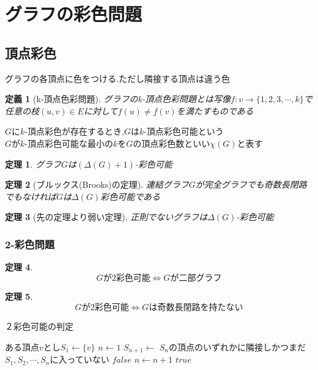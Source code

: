 \documentclass[a4j,10.5pt]{jarticle}
\theoremstyle{break}
\newtheorem{defi}{定義}[section]
\newtheorem{theo}{定理}[section]
\begin{document}
\newpage

\section{グラフの彩色問題}
\subsection{頂点彩色}
グラフの各頂点に色をつける.ただし隣接する頂点は違う色
\begin{defi}[k-頂点色彩問題]
グラフのk-頂点色彩問題とは写像$f:v \rightarrow \{1,2,3,\cdots,k\}$で任意の枝$(u,v) \in E$に対して$f(u) \neq f(v)$を満たすものである
\end{defi}
$G$に$k$-頂点彩色が存在するとき,$G$は$k$-頂点彩色可能という\\
$G$が$k$-頂点彩色可能な最小の$k$を$G$の頂点彩色数といい$\chi(G)$と表す

\begin{theo}
グラフ$G$は$(\Delta(G)+1)$-彩色可能
\end{theo}

\begin{theo}[ブルックス(Brooks)の定理]
連結グラフ$G$が完全グラフでも奇数長閉路でもなければ$G$は$\Delta(G)$彩色可能である
\end{theo}

\begin{theo}[先の定理より弱い定理]
正則でないグラフは$\Delta(G)$-彩色可能
\end{theo}

\subsubsection{2-彩色問題}
\begin{theo}
\[Gが2彩色可能 \Leftrightarrow Gが二部グラフ\]
\end{theo}

\begin{theo}
\[Gが2彩色可能 \Leftrightarrow Gは奇数長閉路を持たない\]
\end{theo}

\begin{algorithm}
\caption{２彩色可能の判定}
\begin{algorithmic}[1]
\STATE ある頂点$v$とし$S_1 \leftarrow \{v\}$
\STATE $n \leftarrow 1$
\STATE $S_{n + 1} \leftarrow$ $S_n$の頂点のいずれかに隣接しかつまだ$S_1,S_2,\cdots,S_n$に入っていない
\RETURN $false$
\ENDIF
\STATE $n \leftarrow n + 1$
\ENDWHILE
\RETURN $true$
\end{algorithmic}
\end{algorithm}
\end{document}
